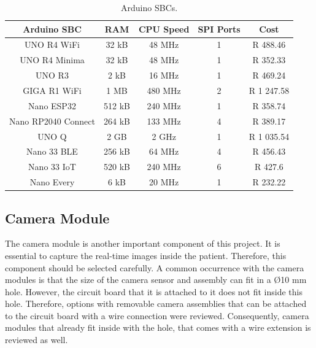 \begin{table}[H]
    \centering
    \caption{Arduino SBCs. \citep{A-P}}
    \begin{tabular}{|c|c|c|c|c|}
        \hline
            Arduino SBC & RAM & CPU Speed & SPI Ports & Cost \\
        \hline
            UNO R4 WiFi & 32 kB & 48 MHz & 1 & R 488.46 \\
        \hline 
            UNO R4 Minima & 32 kB & 48 MHz & 1 & R 352.33 \\
        \hline
            UNO R3 & 2 kB & 16 MHz & 1 & R 469.24\\
        \hline
            GIGA R1 WiFi & 1 MB & 480 MHz & 2 & R 1 247.58 \\
        \hline
            Nano ESP32 & 512 kB & 240 MHz & 1 & R 358.74 \\
        \hline
            Nano RP2040 Connect & 264 kB & 133 MHz & 4 & R 389.17 \\
        \hline
            UNO Q & 2 GB & 2 GHz & 1 & R 1 035.54 \\
        \hline
            Nano 33 BLE & 256 kB & 64 MHz & 4 & R 456.43 \\
        \hline
            Nano 33 IoT & 520 kB & 240 MHz & 6 & R 427.6 \\
        \hline
            Nano Every & 6 kB & 20 MHz & 1 & R 232.22 \\            
        \hline
    \end{tabular}
    \label{tab:Arduino SBCs}
\end{table}

\subsection{Camera Module}
\label{sec:Camera Module}

The camera module is another important component of this project. It is essential to capture the real-time images inside the patient. Therefore, this component should be selected carefully. A common occurrence with the camera modules is that the size of the camera sensor and assembly can fit in a Ø10 mm hole. However, the circuit board that it is attached to it does not fit inside this hole. Therefore, options with removable camera assemblies that can be attached to the circuit board with a wire connection were reviewed. Consequently, camera modules that already fit inside with the hole, that comes with a wire extension is reviewed as well. 

